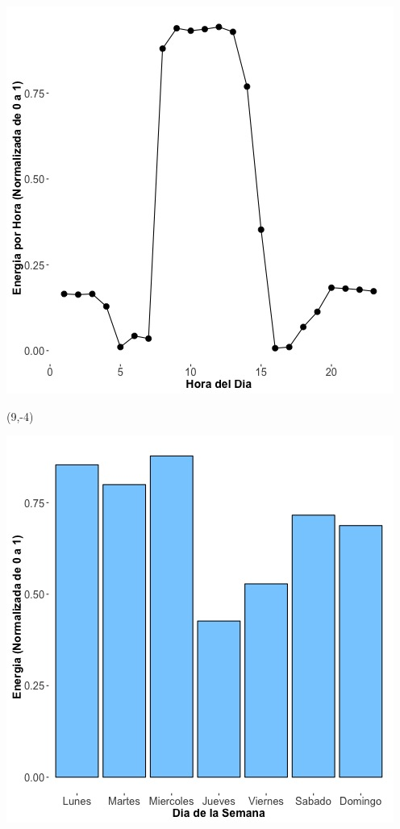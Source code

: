 \documentclass{article}\usepackage[]{graphicx}\usepackage[]{color}
\newenvironment{knitrout}{}{} %
\begin{document}
\begin{knitrout}
\color{fgcolor}
\includegraphics[scale=0.65]{figure/A19_plot_norm_median} 
\end{knitrout}


 \begin{textblock}{1}(9,-4)
\begin{minipage}{20em}
\begingroup

\endgroup
\end{minipage}
\end{textblock}


\begin{knitrout}
\color{fgcolor}
\includegraphics[scale=0.65]{figure/A19_day_of_week_plot} 
\end{knitrout}
\end{document}
